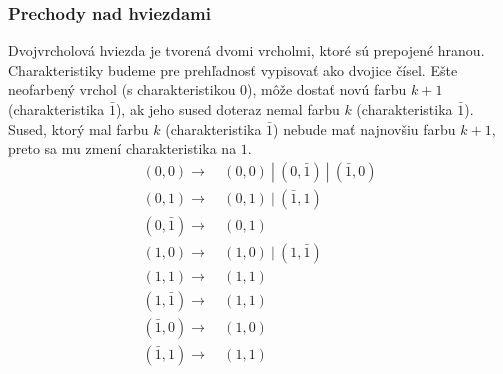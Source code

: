 \subsubsection{Prechody nad hviezdami}

Dvojvrcholová hviezda je tvorená dvomi vrcholmi, ktoré sú prepojené hranou. Charakteristiky budeme pre prehľadnosť
vypisovať ako dvojice čísel. Ešte neofarbený vrchol (s charakteristikou $0$), môže dostať novú farbu $k+1$
(charakteristika $\bar{1}$), ak jeho sused doteraz nemal farbu $k$ (charakteristika $\bar{1}$).
Sused, ktorý mal farbu $k$ (charakteristika $\bar{1}$) nebude mať najnovšiu farbu $k+1$, preto sa mu
zmení charakteristika na $1$.
\begin{align*}
    (0, 0) \to &\ (0, 0) \ | \ (0, \bar{1}) \ | \ (\bar{1}, 0) \\
    (0, 1) \to &\ (0, 1) \ | \ (\bar{1}, 1) \\
    (0, \bar{1}) \to &\ (0, 1) \\
    (1, 0) \to &\ (1, 0) \ | \ (1, \bar{1}) \\
    (1, 1) \to &\ (1, 1) \\
    (1, \bar{1}) \to &\ (1, 1) \\
    (\bar{1}, 0) \to &\ (1, 0) \\
    (\bar{1}, 1) \to &\ (1, 1)
\end{align*}

